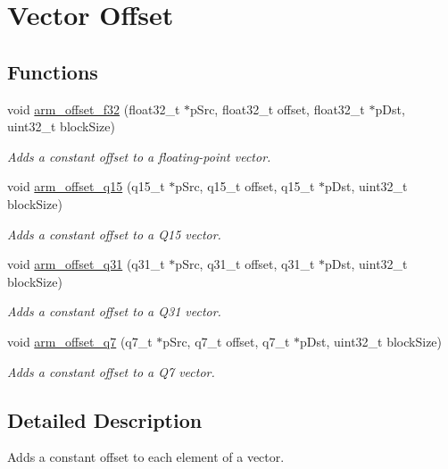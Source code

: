 \hypertarget{group__offset}{}\section{Vector Offset}
\label{group__offset}
\subsection*{Functions}
\begin{DoxyCompactItemize}
\item 
void \hyperlink{group__offset_ga989dfae15235799d82f62ef9d356abb4}{arm\+\_\+offset\+\_\+f32} (float32\+\_\+t $\ast$p\+Src, float32\+\_\+t offset, float32\+\_\+t $\ast$p\+Dst, uint32\+\_\+t block\+Size)
\begin{DoxyCompactList}\small\item\em Adds a constant offset to a floating-\/point vector. \end{DoxyCompactList}\item 
void \hyperlink{group__offset_gab4c1d2391b599549e5a06fdfbc2747bf}{arm\+\_\+offset\+\_\+q15} (q15\+\_\+t $\ast$p\+Src, q15\+\_\+t offset, q15\+\_\+t $\ast$p\+Dst, uint32\+\_\+t block\+Size)
\begin{DoxyCompactList}\small\item\em Adds a constant offset to a Q15 vector. \end{DoxyCompactList}\item 
void \hyperlink{group__offset_gac84ec42cbbebc5c197a87d0221819acf}{arm\+\_\+offset\+\_\+q31} (q31\+\_\+t $\ast$p\+Src, q31\+\_\+t offset, q31\+\_\+t $\ast$p\+Dst, uint32\+\_\+t block\+Size)
\begin{DoxyCompactList}\small\item\em Adds a constant offset to a Q31 vector. \end{DoxyCompactList}\item 
void \hyperlink{group__offset_ga00bd9cc17c5bf905e76c91ad50886393}{arm\+\_\+offset\+\_\+q7} (q7\+\_\+t $\ast$p\+Src, q7\+\_\+t offset, q7\+\_\+t $\ast$p\+Dst, uint32\+\_\+t block\+Size)
\begin{DoxyCompactList}\small\item\em Adds a constant offset to a Q7 vector. \end{DoxyCompactList}\end{DoxyCompactItemize}


\subsection{Detailed Description}
Adds a constant offset to each element of a vector.



